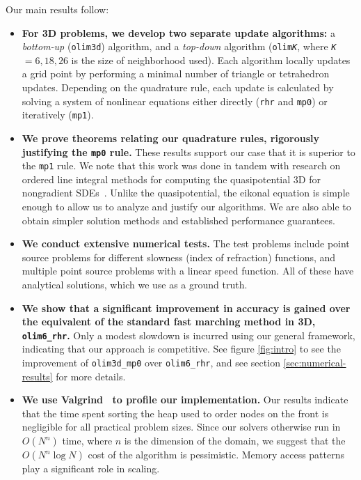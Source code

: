 \documentclass[smallcondensed]{svjour3}
\begin{document}
Our main results follow:
\begin{itemize}
\item \textbf{For 3D problems, we develop two separate update
    algorithms:} a \emph{bottom-up} (\texttt{olim3d}) algorithm, and a
  \emph{top-down} algorithm (\texttt{olim\emph{K}}, where
  \texttt{\emph{K}} \hspace{-0.1em}$=6,18,26$ is the size of
  neighborhood used). Each algorithm locally updates a grid point by
  performing a minimal number of triangle or tetrahedron
  updates. Depending on the quadrature rule, each update is calculated
  by solving a system of nonlinear equations either directly
  (\texttt{rhr} and \texttt{mp0}) or iteratively (\texttt{mp1}).
\item \textbf{We prove theorems relating our quadrature rules,
    rigorously justifying the \texttt{mp0} rule.} These results
  support our case that it is superior to the \texttt{mp1} rule. We
  note that this work was done in tandem with research on ordered line
  integral methods for computing the quasipotential 3D for nongradient
  SDEs~\cite{dahiya2017ordered,yang2019computing,dahiya2018ordered}. Unlike
  the quasipotential, the eikonal equation is simple enough to allow
  us to analyze and justify our algorithms. We are also able to obtain
  simpler solution methods and established performance guarantees.
\item \textbf{We conduct extensive numerical tests.} The test problems
  include point source problems for different slowness (index of
  refraction) functions, and multiple point source problems with a
  linear speed function. All of these have analytical solutions, which
  we use as a ground truth.
\item \textbf{We show that a significant improvement in accuracy is
    gained over the equivalent of the standard fast marching method in
    3D, \texttt{olim6\_rhr}.} Only a modest slowdown is incurred using
  our general framework, indicating that our approach is
  competitive. See figure \ref{fig:intro} to see the improvement of
  \texttt{olim3d\_mp0} over \texttt{olim6\_rhr}, and see section\@
  \ref{sec:numerical-results} for more details.
\item \textbf{We use Valgrind~\cite{nethercote2007valgrind} to profile
    our implementation.} Our results indicate that the time spent
  sorting the heap used to order nodes on the front is negligible for
  all practical problem sizes. Since our solvers otherwise run in
  $O(N^n)$ time, where $n$ is the dimension of the domain, we suggest
  that the $O(N^n \log N)$ cost of the algorithm is
  pessimistic. Memory access patterns play a significant role in
  scaling.
\end{itemize}
\end{document}
